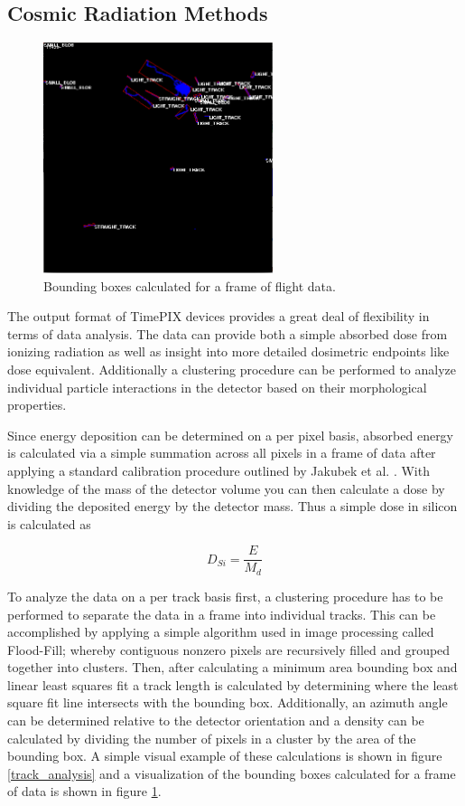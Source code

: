 \subsection{Cosmic Radiation Methods}
\label{sec:Rad-Methods}

\begin{figure}[H]
	\begin{center}
	\includegraphics[width=0.6\textwidth]{figures/clustering.png}
	\caption{Bounding boxes calculated for a frame of flight data.}
	\label{clusterframe}
	\end{center}
\end{figure}

The output format of TimePIX devices provides a great deal of flexibility in terms of data analysis. The data can provide both a simple absorbed dose from ionizing radiation as well as insight into more detailed dosimetric endpoints like dose equivalent. Additionally a clustering procedure can be performed to analyze individual particle interactions in the detector based on their morphological properties.

 Since energy deposition can be determined on a per pixel basis, absorbed energy is calculated via a simple summation across all pixels in a frame of data after applying a standard calibration procedure outlined by Jakubek et al. \cite{mpjakubek}. With knowledge of the mass of the detector volume you can then calculate a dose by dividing the deposited energy by the detector mass. Thus a simple dose in silicon is calculated as

\[D_{Si} = \frac{E}{M_{d}}\]


To analyze the data on a per track basis first, a clustering procedure has to be performed to separate the data in a frame into individual tracks. This can be accomplished by applying a simple algorithm used in image processing called Flood-Fill; whereby contiguous nonzero pixels are recursively filled and grouped together into clusters. Then, after calculating a minimum area bounding box and linear least squares fit a track length is calculated by determining where the least square fit line intersects with the bounding box. Additionally, an azimuth angle can be determined relative to the detector orientation and a density can be calculated by dividing the number of pixels in a cluster by the area of the bounding box. A simple visual example of these calculations is shown in figure \ref{track_analysis} and a visualization of the bounding boxes calculated for a frame of data is shown in figure \ref{clusterframe}.


